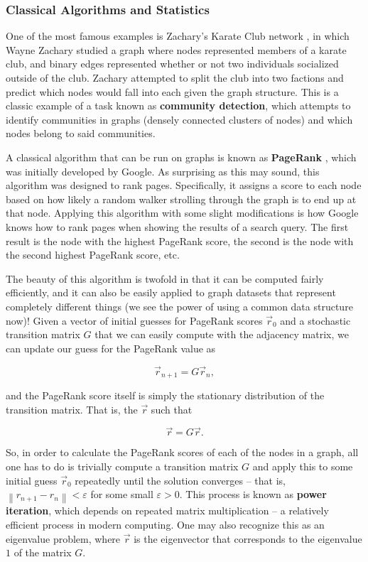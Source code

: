 \documentclass[12pt]{article}
\theoremstyle{definition}
\newcommand{\norm}[1]{\left\lVert#1\right\rVert}
\begin{document}
\subsubsection{Classical Algorithms and Statistics}

One of the most famous examples is Zachary's Karate Club network \cite{zacharyKarateClub}, in which Wayne Zachary studied a graph where nodes represented members of a karate club, and binary edges represented whether or not two individuals socialized outside of the club. Zachary attempted to split the club into two factions and predict which nodes would fall into each given the graph structure. This is a classic example of a task known as \textbf{community detection}, which attempts to identify communities in graphs (densely connected clusters of nodes) and which nodes belong to said communities.

A classical algorithm that can be run on graphs is known as \textbf{PageRank} \cite{PageRank}, which was initially developed by Google. As surprising as this may sound, this algorithm was designed to rank pages. Specifically, it assigns a score to each node based on how likely a random walker strolling through the graph is to end up at that node. Applying this algorithm with some slight modifications is how Google knows how to rank pages when showing the results of a search query. The first result is the node with the highest PageRank score, the second is the node with the second highest PageRank score, etc. 

The beauty of this algorithm is twofold in that it can be computed fairly efficiently, and it can also be easily applied to graph datasets that represent completely different things (we see the power of using a common data structure now)! Given a vector of initial guesses for PageRank scores $\Vec{r}_0$ and a stochastic transition matrix $G$ that we can easily compute with the adjacency matrix, we can update our guess for the PageRank value as

\[
\Vec{r}_{n+1} = G \Vec{r}_n,
\]

and the PageRank score itself is simply the stationary distribution of the transition matrix. That is, the $\Vec{r}$ such that

\[
\Vec{r} = G \Vec{r}.
\]

So, in order to calculate the PageRank scores of each of the nodes in a graph, all one has to do is trivially compute a transition matrix $G$ and apply this to some initial guess $\Vec{r}_0$ repeatedly until the solution converges -- that is, $\norm{r_{n+1} - r_{n}} < \varepsilon$ for some small $\varepsilon > 0$. This process is known as \textbf{power iteration}, which depends on repeated matrix multiplication -- a relatively efficient process in modern computing. One may also recognize this as an eigenvalue problem, where $\Vec{r}$ is the eigenvector that corresponds to the eigenvalue $1$ of the matrix $G$.
\end{document}
